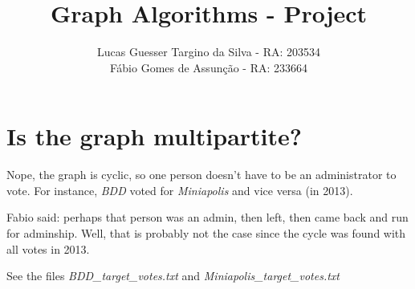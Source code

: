 \documentclass{article}
\title{Graph Algorithms - Project}
\author{
    Lucas Guesser Targino da Silva - RA: 203534\\
    Fábio Gomes de Assunção - RA: 233664
}
\begin{document}
\maketitle

\section{Is the graph multipartite?}

Nope, the graph is cyclic, so one person doesn't have to be an administrator to vote. For instance, \textit{BDD} voted for \textit{Miniapolis} and vice versa (in 2013).

Fabio said: perhaps that person was an admin, then left, then came back and run for adminship. Well, that is probably not the case since the cycle was found with all votes in 2013.

See the files \textit{BDD\_target\_votes.txt} and \textit{Miniapolis\_target\_votes.txt}
\end{document}
